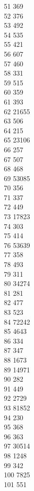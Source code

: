 { 51	369 \\
 52	376 \\
 53	492 \\
 54	535 \\
 55	421 \\
 56	607 \\
 57	460 \\
 58	331 \\
 59	515 \\
 60	359 \\
 61	393 \\
 62	21655 \\
 63	506 \\
 64	215 \\
 65	23106 \\
 66	257 \\
 67	507 \\
 68	468 \\
 69	53085 \\
 70	356 \\
 71	337 \\
 72	449 \\
 73	17823 \\
 74	303 \\
 75	414 \\
 76	53639 \\
 77	358 \\
 78	493 \\
 79	311 \\
 80	34274 \\
 81	281 \\
 82	477 \\
 83	523 \\
 84	72242 \\
 85	4643 \\
 86	334 \\
 87	347 \\
 88	1673 \\
 89	14971 \\
 90	282 \\
 91	449 \\
 92	2729 \\
 93	81852 \\
 94	230 \\
 95	368 \\
 96	363 \\
 97	30514 \\
 98	1248 \\
 99	342 \\
 100	7825 \\
 101	551 \\
}
